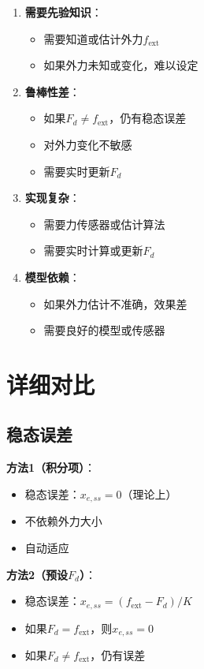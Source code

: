 \documentclass[12pt,a4paper]{article}
\begin{document}
\begin{enumerate}
\item \textbf{需要先验知识}：
\begin{itemize}
\item 需要知道或估计外力$f_{\text{ext}}$
\item 如果外力未知或变化，难以设定
\end{itemize}

\item \textbf{鲁棒性差}：
\begin{itemize}
\item 如果$F_d \neq f_{\text{ext}}$，仍有稳态误差
\item 对外力变化不敏感
\item 需要实时更新$F_d$
\end{itemize}

\item \textbf{实现复杂}：
\begin{itemize}
\item 需要力传感器或估计算法
\item 需要实时计算或更新$F_d$
\end{itemize}

\item \textbf{模型依赖}：
\begin{itemize}
\item 如果外力估计不准确，效果差
\item 需要良好的模型或传感器
\end{itemize}
\end{enumerate}

\section{详细对比}

\subsection{稳态误差}

\textbf{方法1（积分项）}：
\begin{itemize}
\item 稳态误差：$x_{e,ss} = 0$（理论上）
\item 不依赖外力大小
\item 自动适应
\end{itemize}

\textbf{方法2（预设$F_d$）}：
\begin{itemize}
\item 稳态误差：$x_{e,ss} = (f_{\text{ext}} - F_d)/K$
\item 如果$F_d = f_{\text{ext}}$，则$x_{e,ss} = 0$
\item 如果$F_d \neq f_{\text{ext}}$，仍有误差
\end{itemize}
\end{document}
